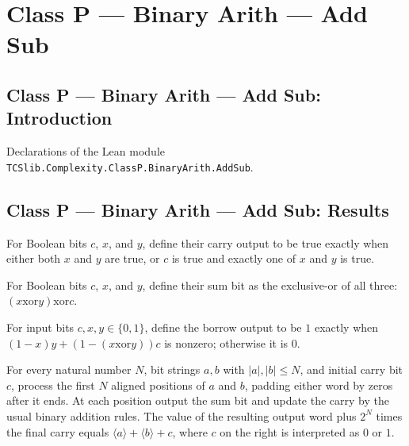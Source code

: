 \section{Class P --- Binary Arith --- Add Sub}
\subsection*{Class P --- Binary Arith --- Add Sub: Introduction}

Declarations of the Lean module \texttt{TCSlib.Complexity.ClassP.BinaryArith.AddSub}.

\subsection*{Class P --- Binary Arith --- Add Sub: Results}

\begin{definition}
\label{Complexity.BinArith.carry}
\leanok
For Boolean bits $c$, $x$, and $y$, define their carry output to be true exactly when
either both $x$ and $y$ are true, or $c$ is true and exactly one of $x$ and $y$ is true.
\end{definition}

\begin{definition}
\label{Complexity.BinArith.sumBit}
\leanok
For Boolean bits $c$, $x$, and $y$, define their sum bit as the exclusive-or of all
three: $(x\mathbin{\mathrm{xor}} y)\mathbin{\mathrm{xor}} c$.
\end{definition}

\begin{definition}
\label{Complexity.BinArith.borrow}
\leanok
For input bits $c,x,y\in\{0,1\}$, define the borrow output to be $1$ exactly when
$(1-x)y+(1-(x\mathbin{\mathrm{xor}}y))c$ is nonzero; otherwise it is $0$.
\end{definition}

\begin{theorem}
\label{Complexity.BinArith.serial_add}
\leanok
{}
For every natural number $N$, bit strings $a,b$ with $|a|,|b|\leq N$, and initial carry
bit $c$, process the first $N$ aligned positions of $a$ and $b$, padding either word by
zeros after it ends. At each position output the sum bit and update the carry by the
usual binary addition rules. The value of the resulting output word plus $2^N$ times the
final carry equals $\langle a\rangle+\langle b\rangle+c$, where $c$ on the right is
interpreted as $0$ or $1$.
\end{theorem}

